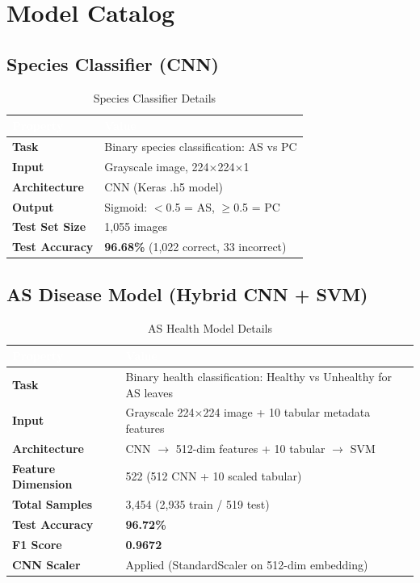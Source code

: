 \documentclass[11pt,a4paper,oneside]{report}
\begin{document}
\section{Model Catalog}

\subsection{Species Classifier (CNN)}

\begin{table}[H]
\centering\footnotesize
\caption{Species Classifier Details}
\label{tab:species-model}
\begin{tabularx}{\textwidth}{>{\bfseries}p{2.8cm} X}
\toprule
\rowcolor{tableheader}
\textcolor{white}{Property} & \textcolor{white}{Value} \\
\midrule
Task              & Binary species classification: AS vs PC \\
Input             & Grayscale image, 224$\times$224$\times$1 \\
Architecture      & CNN (Keras .h5 model) \\
Output            & Sigmoid: $<$0.5 = AS, $\geq$0.5 = PC \\
Test Set Size     & 1,055 images \\
Test Accuracy     & \textbf{96.68\%} (1,022 correct, 33 incorrect) \\
\bottomrule
\end{tabularx}
\end{table}

\subsection{AS Disease Model (Hybrid CNN + SVM)}

\begin{table}[H]
\centering\footnotesize
\caption{AS Health Model Details}
\label{tab:as-model}
\begin{tabularx}{\textwidth}{>{\bfseries}p{2.8cm} X}
\toprule
\rowcolor{tableheader}
\textcolor{white}{Property} & \textcolor{white}{Value} \\
\midrule
Task              & Binary health classification: Healthy vs Unhealthy for AS leaves \\
Input             & Grayscale 224$\times$224 image + 10 tabular metadata features \\
Architecture      & CNN $\to$ 512-dim features + 10 tabular $\to$ SVM \\
Feature Dimension & 522 (512 CNN + 10 scaled tabular) \\
Total Samples     & 3,454 (2,935 train / 519 test) \\
Test Accuracy     & \textbf{96.72\%} \\
F1 Score          & \textbf{0.9672} \\
CNN Scaler        & Applied (StandardScaler on 512-dim embedding) \\
\bottomrule
\end{tabularx}
\end{table}
\end{document}
